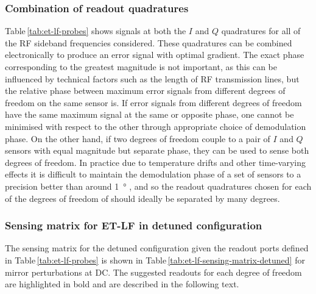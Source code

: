 \subsubsection{Combination of readout quadratures}
Table\,\ref{tab:et-lf-probes} shows signals at both the $I$ and $Q$ quadratures for all of the \gls{RF} sideband frequencies considered. These quadratures can be combined electronically to produce an error signal with optimal gradient. The exact phase corresponding to the greatest magnitude is not important, as this can be influenced by technical factors such as the length of \gls{RF} transmission lines, but the relative phase between maximum error signals from different degrees of freedom on the same sensor is. If error signals from different degrees of freedom have the same maximum signal at the same or opposite phase, one cannot be minimised with respect to the other through appropriate choice of demodulation phase. On the other hand, if two degrees of freedom couple to a pair of $I$ and $Q$ sensors with equal magnitude but separate phase, they can be used to sense both degrees of freedom. In practice due to temperature drifts and other time-varying effects it is difficult to maintain the demodulation phase of a set of sensors to a precision better than around \SI{1}{\degree} \cite{Effler2014}, and so the readout quadratures chosen for each of the degrees of freedom of \ETLF{} should ideally be separated by many degrees.

\subsubsection{Sensing matrix for ET-LF in detuned configuration}
The sensing matrix for the detuned configuration given the readout ports defined in Table\,\ref{tab:et-lf-probes} is shown in Table\,\ref{tab:et-lf-sensing-matrix-detuned} for mirror perturbations at \gls{DC}. The suggested readouts for each degree of freedom are highlighted in bold and are described in the following text.

